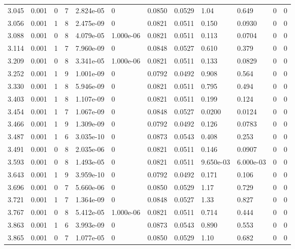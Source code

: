 \documentclass[preview]{standalone}
\begin{document}
{{{\begin{tabular}{L{1.2cm}C{1.2cm} C{0.3cm}C{0.5cm} C{1.4cm}C{1.4cm} C{1.4cm}C{1.4cm} C{1.6cm}C{1.6cm} C{1.6cm}C{1.6cm}}
  3.045  &  0.001  & 0     &  7 &  2.824e-05  & 0  &  0.0850&   0.0529& 1.04 & 0.649   &  0 & 0  \\ 
  3.056  &  0.001  & 1     &  8 &  2.475e-09  & 0  &  0.0821&   0.0511& 0.150 & 0.0930   &  0 & 0  \\ 
  3.088  &  0.001  & 0     &  8 &  4.079e-05  & 1.000e-06  &  0.0821&   0.0511& 0.113 & 0.0704   &  0 & 0  \\ 
  3.114  &  0.001  & 1     &  7 &  7.960e-09  & 0  &  0.0848&   0.0527& 0.610 & 0.379   &  0 & 0  \\ 
  3.209  &  0.001  & 0     &  8 &  3.341e-05  & 1.000e-06  &  0.0821&   0.0511& 0.133 & 0.0829   &  0 & 0  \\ 
  3.252  &  0.001  & 1     &  9 &  1.001e-09  & 0  &  0.0792&   0.0492& 0.908 & 0.564   &  0 & 0  \\ 
  3.330  &  0.001  & 1     &  8 &  5.946e-09  & 0  &  0.0821&   0.0511& 0.795 & 0.494   &  0 & 0  \\ 
  3.403  &  0.001  & 1     &  8 &  1.107e-09  & 0  &  0.0821&   0.0511& 0.199 & 0.124   &  0 & 0  \\ 
  3.454  &  0.001  & 1     &  7 &  1.067e-09  & 0  &  0.0848&   0.0527& 0.0200 & 0.0124   &  0 & 0  \\ 
  3.466  &  0.001  & 1     &  9 &  1.309e-09  & 0  &  0.0792&   0.0492& 0.126 & 0.0783   &  0 & 0  \\ 
  3.487  &  0.001  & 1     &  6 &  3.035e-10  & 0  &  0.0873&   0.0543& 0.408 & 0.253   &  0 & 0  \\ 
  3.491  &  0.001  & 0     &  8 &  2.035e-06  & 0  &  0.0821&   0.0511& 0.146 & 0.0907   &  0 & 0  \\ 
  3.593  &  0.001  & 0     &  8 &  1.493e-05  & 0  &  0.0821&   0.0511& 9.650e-03 & 6.000e-03   &  0 & 0  \\ 
  3.643  &  0.001  & 1     &  9 &  3.959e-10  & 0  &  0.0792&   0.0492& 0.171 & 0.106   &  0 & 0  \\ 
  3.696  &  0.001  & 0     &  7 &  5.660e-06  & 0  &  0.0850&   0.0529& 1.17 & 0.729   &  0 & 0  \\ 
  3.721  &  0.001  & 1     &  7 &  1.364e-09  & 0  &  0.0848&   0.0527& 1.33 & 0.827   &  0 & 0  \\ 
  3.767  &  0.001  & 0     &  8 &  5.412e-05  & 1.000e-06  &  0.0821&   0.0511& 0.714 & 0.444   &  0 & 0  \\ 
  3.863  &  0.001  & 1     &  6 &  3.993e-09  & 0  &  0.0873&   0.0543& 0.890 & 0.553   &  0 & 0  \\ 
  3.865  &  0.001  & 0     &  7 &  1.077e-05  & 0  &  0.0850&   0.0529& 1.10 & 0.682   &  0 & 0  \\ 

\end{tabular}}}}
\end{document}
